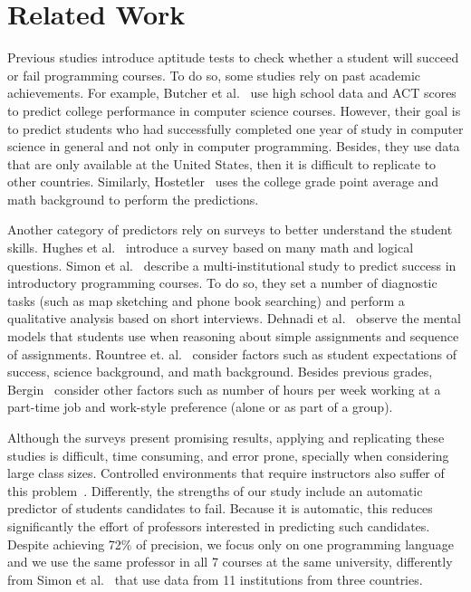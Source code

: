 \section{Related Work}

\label{sec:related}

Previous studies introduce aptitude tests to check whether a student will succeed or fail programming courses. To do so, some studies rely on past academic achievements. For example, Butcher et al.~\cite{butcher-predictor-high-school-1985} use high school data and ACT scores to predict college performance in computer science courses. However, their goal is to predict students who had successfully completed one year of study in computer science in general and not only in computer programming. Besides, they use data that are only available at the United States, then it is difficult to replicate to other countries. Similarly, Hostetler~\cite{hostetler-aptitude-1983} uses the college grade point average and math background to perform the predictions.

Another category of predictors rely on surveys to better understand the student skills. Hughes et al.~\cite{ibm-aptitude-test} introduce a survey based on many math and logical questions. Simon et al.~\cite{simon-predictors-ace2006} describe a multi-institutional study to predict success in introductory programming courses. To do so, they set a number of diagnostic tasks (such as map sketching and phone book searching) and perform a qualitative analysis based on short interviews. Dehnadi et al.~\cite{camel-2006} observe the mental models that students use when reasoning about simple assignments and sequence of assignments. Rountree et. al.~\cite{nathan-2004} consider factors such as student expectations of success, science background, and math background. Besides previous grades, Bergin~\cite{susan-sigce2005} consider other factors such as number of hours per week working at a part-time job and work-style preference (alone or as part of a group).

Although the surveys present promising results, applying and replicating these studies is difficult, time consuming, and error prone, specially when considering large class sizes. Controlled environments that require instructors also suffer of this problem~\cite{barker-predictor-83}. Differently, the strengths of our study include an automatic predictor of students candidates to fail. Because it is automatic, this reduces significantly the effort of professors interested in predicting such candidates. Despite achieving 72\% of precision, we focus only on one programming language and we use the same professor in all 7 courses at the same university, differently from Simon et al.~\cite{simon-predictors-ace2006} that use data from 11 institutions from three countries.

